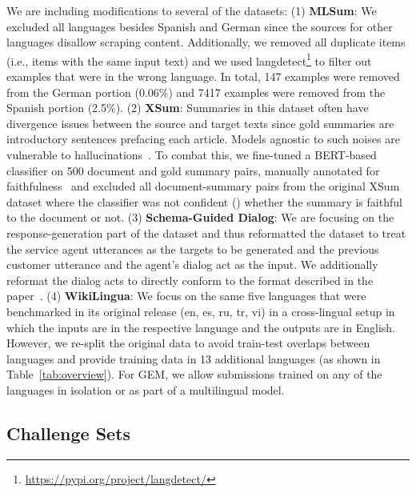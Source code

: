 \documentclass[11pt,a4paper]{article}
\newcommand{\GEM}{\textsc{GEM}}
\begin{document}
We are including modifications to several of the datasets: (1) \textbf{MLSum}: We excluded all languages besides Spanish and German since the sources for other languages disallow scraping content. Additionally, we removed all duplicate items (i.e., items with the same input text) and we used langdetect\footnote{\url{https://pypi.org/project/langdetect/}} to filter out examples that were in the wrong language. In total, 147 examples were removed from the German portion (0.06\%) and 7417 examples were removed from the Spanish portion (2.5\%).
(2) \textbf{XSum}: Summaries in this dataset often have divergence issues between the source and target texts since gold summaries are introductory sentences prefacing each article. Models agnostic to such noises are vulnerable to hallucinations~\citep{wiseman-etal-2017-challenges,dhingra2019handling}. To combat this, we fine-tuned a BERT-based~\citep{devlin-2019-bert} classifier on 500 document and gold summary pairs, manually annotated for faithfulness~\citep{maynez2020faithfulness} and excluded all document-summary pairs from the original XSum dataset where the classifier was not confident () whether the summary is faithful to the document or not.
(3) \textbf{Schema-Guided Dialog}: We are focusing on the response-generation part of the dataset and thus reformatted the dataset to treat the service agent utterances as the targets to be generated and the previous customer utterance and the agent's dialog act as the input. We additionally reformat the dialog acts to directly conform to the format described in the paper~\citep{kale2020few}. 
(4) \textbf{WikiLingua}: We focus on the same five languages that were benchmarked in its original release (en, es, ru, tr, vi) in a cross-lingual setup in which the inputs are in the respective language and the outputs are in English. However, we re-split the original data to avoid train-test overlaps between languages and provide training data in 13 additional languages (as shown in Table~\ref{tab:overview}). For \GEM, we allow submissions trained on any of the languages in isolation or as part of a multilingual model. 


\subsection{Challenge Sets} 
\end{document}
